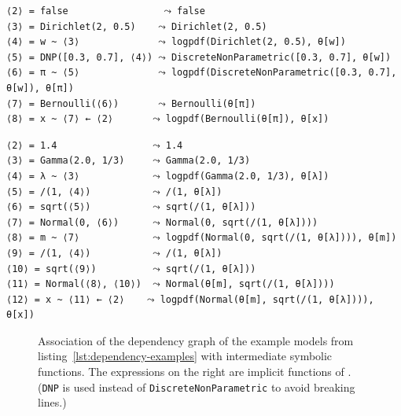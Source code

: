 \newsavebox{\bmlikelihoods}
\begin{lrbox}{\bmlikelihoods}
\begin{lstlisting}[style=lstfloat]
⟨2⟩ = false                 ⤳ false
⟨3⟩ = Dirichlet(2, 0.5)    ⤳ Dirichlet(2, 0.5)
⟨4⟩ = w ~ ⟨3⟩              ⤳ logpdf(Dirichlet(2, 0.5), θ[w])
⟨5⟩ = DNP([0.3, 0.7], ⟨4⟩) ⤳ DiscreteNonParametric([0.3, 0.7], θ[w])
⟨6⟩ = π ~ ⟨5⟩              ⤳ logpdf(DiscreteNonParametric([0.3, 0.7], θ[w]), θ[π])
⟨7⟩ = Bernoulli(⟨6⟩)       ⤳ Bernoulli(θ[π])
⟨8⟩ = x ~ ⟨7⟩ ← ⟨2⟩       ⤳ logpdf(Bernoulli(θ[π]), θ[x])
\end{lstlisting}
\end{lrbox}
\newsavebox{\hglikelihoods}
\begin{lrbox}{\hglikelihoods}
\begin{lstlisting}[style=lstfloat]
⟨2⟩ = 1.4                 ⤳ 1.4
⟨3⟩ = Gamma(2.0, 1/3)     ⤳ Gamma(2.0, 1/3)
⟨4⟩ = λ ~ ⟨3⟩             ⤳ logpdf(Gamma(2.0, 1/3), θ[λ])
⟨5⟩ = /(1, ⟨4⟩)           ⤳ /(1, θ[λ])
⟨6⟩ = sqrt(⟨5⟩)           ⤳ sqrt(/(1, θ[λ]))
⟨7⟩ = Normal(0, ⟨6⟩)      ⤳ Normal(0, sqrt(/(1, θ[λ])))
⟨8⟩ = m ~ ⟨7⟩             ⤳ logpdf(Normal(0, sqrt(/(1, θ[λ]))), θ[m])
⟨9⟩ = /(1, ⟨4⟩)           ⤳ /(1, θ[λ])
⟨10⟩ = sqrt(⟨9⟩)          ⤳ sqrt(/(1, θ[λ]))
⟨11⟩ = Normal(⟨8⟩, ⟨10⟩)  ⤳ Normal(θ[m], sqrt(/(1, θ[λ])))
⟨12⟩ = x ~ ⟨11⟩ ← ⟨2⟩    ⤳ logpdf(Normal(θ[m], sqrt(/(1, θ[λ]))), θ[x])
\end{lstlisting}
\end{lrbox}
\begin{figure}[t]
  \loosesubcaptions
  \caption{Association of the dependency graph of the example models from
    listing~\ref{lst:dependency-examples} with intermediate symbolic functions.  The expressions on
    the right are implicit functions of \protect{}.  (\texttt{DNP} is used instead of
    \texttt{DiscreteNonParametric} to avoid breaking lines.)}
  \label{fig:continuations}
\end{figure}

